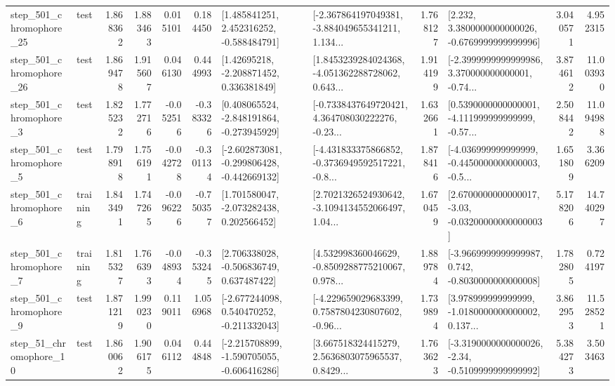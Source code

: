 \begin{tabular}{llrrrrllrlrr}
  step\_501\_chromophore\_25 &      test &      1.868362 &    1.883463 &      0.015101 &  0.184450 &    [1.485841251, 2.452316252, -0.588484791] &  [-2.367864197049381, -3.884049655341211, 1.134... &       1.768127 &   [2.232, 3.3800000000000026, -0.6769999999999996] &            3.040571 &          4.952315 \\
  step\_501\_chromophore\_26 &      test &      1.869478 &    1.915607 &      0.046130 &  0.444993 &     [1.42695218, -2.208871452, 0.336381849] &  [1.8453239284024368, -4.051362288728062, 0.643... &       1.914199 &  [-2.3999999999999986, 3.370000000000001, -0.74... &            3.874612 &         11.003930 \\
   step\_501\_chromophore\_3 &      test &      1.825232 &    1.772716 &     -0.052516 & -0.383326 &   [0.408065524, -2.848191864, -0.273945929] &  [-0.7338437649720421, 4.364708030222276, -0.23... &       1.632661 &  [0.5390000000000001, -4.111999999999999, -0.57... &            2.508442 &         11.094988 \\
   step\_501\_chromophore\_5 &      test &      1.798918 &    1.756191 &     -0.042728 & -0.301134 &  [-2.602873081, -0.299806428, -0.442669132] &  [-4.431833375866852, -0.3736949592517221, -0.8... &       1.878416 &  [-4.036999999999999, -0.4450000000000003, -0.5... &            1.651809 &          3.366209 \\
   step\_501\_chromophore\_6 &  training &      1.843491 &    1.747265 &     -0.096226 & -0.750357 &    [1.701580047, -2.073282438, 0.202566452] &  [2.7021326524930642, -3.1094134552066497, 1.04... &       1.670459 &  [2.6700000000000017, -3.03, -0.03200000000000003] &            5.178206 &         14.740297 \\
   step\_501\_chromophore\_7 &  training &      1.815327 &    1.766393 &     -0.048934 & -0.353245 &    [2.706338028, -0.506836749, 0.637487422] &  [4.532998360046629, -0.8509288775210067, 0.978... &       1.889784 &  [-3.9669999999999987, 0.742, -0.8030000000000008] &            1.782805 &          0.724197 \\
   step\_501\_chromophore\_9 &      test &      1.871219 &    1.990230 &      0.119011 &  1.056968 &   [-2.677244098, 0.540470252, -0.211332043] &  [-4.229659029683399, 0.7587804230807602, -0.96... &       1.739894 &  [3.978999999999999, -1.0180000000000002, 0.137... &            3.862953 &         11.528521 \\
   step\_51\_chromophore\_10 &      test &      1.860062 &    1.906175 &      0.046112 &  0.444848 &  [-2.215708899, -1.590705055, -0.606416286] &  [3.667518324415279, 2.5636803075965537, 0.8429... &       1.763623 &  [-3.3190000000000026, -2.34, -0.5109999999999992] &            5.384273 &          3.503463 \\

\end{tabular}
